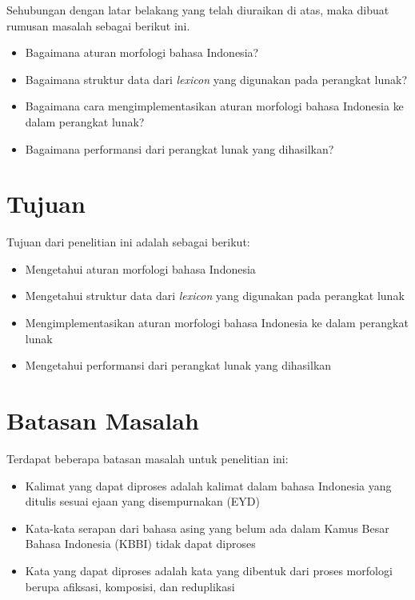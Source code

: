 Sehubungan dengan latar belakang yang telah diuraikan di atas, maka dibuat rumusan masalah sebagai berikut ini.
\begin{itemize}
	\item Bagaimana aturan morfologi bahasa Indonesia?
	\item Bagaimana struktur data dari {\it lexicon} yang digunakan pada perangkat lunak?
	\item Bagaimana cara mengimplementasikan aturan morfologi bahasa Indonesia ke dalam perangkat lunak?
	\item Bagaimana performansi dari perangkat lunak yang dihasilkan?
\end{itemize}

\section{Tujuan}
\label{sec:tujuan}

Tujuan dari penelitian ini adalah sebagai berikut:
\begin{itemize}
	\item Mengetahui aturan morfologi bahasa Indonesia
	\item Mengetahui struktur data dari {\it lexicon} yang digunakan pada perangkat lunak
	\item Mengimplementasikan aturan morfologi bahasa Indonesia ke dalam perangkat lunak
	\item Mengetahui performansi dari perangkat lunak yang dihasilkan
\end{itemize}

\section{Batasan Masalah}
\label{sec:batasanMasalah}

Terdapat beberapa batasan masalah untuk penelitian ini:

\begin{itemize}
	\item Kalimat yang dapat diproses adalah kalimat dalam bahasa Indonesia yang ditulis sesuai ejaan yang disempurnakan (EYD)
	\item Kata-kata serapan dari bahasa asing yang belum ada dalam Kamus Besar Bahasa Indonesia (KBBI) tidak dapat diproses
	\item Kata yang dapat diproses adalah kata yang dibentuk dari proses morfologi berupa afiksasi, komposisi, dan reduplikasi
\end{itemize}

